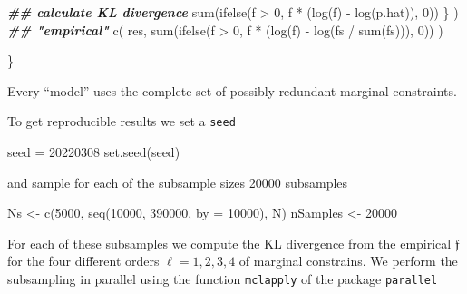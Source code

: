 \documentclass[
]{article}
\newenvironment{Shaded}{\begin{snugshade}}{\end{snugshade}}
\newcommand{\AttributeTok}[1]{\textcolor[rgb]{0.77,0.63,0.00}{#1}}
\newcommand{\DecValTok}[1]{\textcolor[rgb]{0.00,0.00,0.81}{#1}}
\newcommand{\DocumentationTok}[1]{\textcolor[rgb]{0.56,0.35,0.01}{\textbf{\textit{#1}}}}
\newcommand{\FunctionTok}[1]{\textcolor[rgb]{0.00,0.00,0.00}{#1}}
\newcommand{\NormalTok}[1]{#1}
\newcommand{\OtherTok}[1]{\textcolor[rgb]{0.56,0.35,0.01}{#1}}
\newcommand{\SpecialCharTok}[1]{\textcolor[rgb]{0.00,0.00,0.00}{#1}}
\newcommand{\prob}[1]{\mathfrak{#1}}
\begin{document}
\begin{Shaded}
\begin{Highlighting}[]
      \DocumentationTok{\#\# calculate KL divergence}
      \FunctionTok{sum}\NormalTok{(}\FunctionTok{ifelse}\NormalTok{(f }\SpecialCharTok{\textgreater{}} \DecValTok{0}\NormalTok{, f }\SpecialCharTok{*}\NormalTok{ (}\FunctionTok{log}\NormalTok{(f) }\SpecialCharTok{{-}} \FunctionTok{log}\NormalTok{(p.hat)), }\DecValTok{0}\NormalTok{))}
\NormalTok{    \}}
\NormalTok{  )}
  \DocumentationTok{\#\# "empirical"}
  \FunctionTok{c}\NormalTok{(}
\NormalTok{    res,}
    \FunctionTok{sum}\NormalTok{(}\FunctionTok{ifelse}\NormalTok{(f }\SpecialCharTok{\textgreater{}} \DecValTok{0}\NormalTok{, f }\SpecialCharTok{*}\NormalTok{ (}\FunctionTok{log}\NormalTok{(f) }\SpecialCharTok{{-}} \FunctionTok{log}\NormalTok{(fs }\SpecialCharTok{/} \FunctionTok{sum}\NormalTok{(fs))), }\DecValTok{0}\NormalTok{))}
\NormalTok{  )}
    
\NormalTok{\}}
\end{Highlighting}
\end{Shaded}

Every ``model'' uses the complete set of possibly redundant marginal
constraints.

To get reproducible results we set a \texttt{seed}

\begin{Shaded}
\begin{Highlighting}[]
\NormalTok{seed }\OtherTok{=} \DecValTok{20220308}
\FunctionTok{set.seed}\NormalTok{(seed)}
\end{Highlighting}
\end{Shaded}

and sample for each of the subsample sizes 20000 subsamples

\begin{Shaded}
\begin{Highlighting}[]
\NormalTok{Ns }\OtherTok{\textless{}{-}} \FunctionTok{c}\NormalTok{(}\DecValTok{5000}\NormalTok{, }\FunctionTok{seq}\NormalTok{(}\DecValTok{10000}\NormalTok{, }\DecValTok{390000}\NormalTok{, }\AttributeTok{by =} \DecValTok{10000}\NormalTok{), N)}
\NormalTok{nSamples }\OtherTok{\textless{}{-}} \DecValTok{20000}
\end{Highlighting}
\end{Shaded}

For each of these subsamples we compute the KL divergence from the
empirical \(\prob f\) for the four different orders \(\ell = 1,2,3,4\)
of marginal constrains. We perform the subsampling in parallel using the
function \texttt{mclapply} of the package \texttt{parallel}
\end{document}
